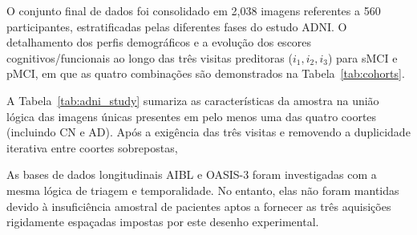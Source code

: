 \documentclass[review]{elsarticle}
\begin{document}
	O conjunto final de dados foi consolidado em 2{,}038 imagens referentes a 560 participantes, estratificadas pelas diferentes fases do estudo ADNI.
	O detalhamento dos perfis demográficos e a evolução dos escores cognitivos/funcionais ao longo das três visitas preditoras ($i_1, i_2, i_3$) para sMCI e pMCI, em que as quatro combinações são demonstrados na Tabela~\ref{tab:cohorts}.
	
	A Tabela~\ref{tab:adni_study} sumariza as características da amostra na união lógica das imagens únicas presentes em pelo menos uma das quatro coortes (incluindo CN e AD). Após a exigência das três visitas e removendo a duplicidade iterativa entre coortes sobrepostas,
	
	As bases de dados longitudinais AIBL \cite{ellis-2009} e OASIS-3 \cite{lamontagne-2019} foram investigadas com a mesma lógica de triagem e temporalidade. No entanto, elas não foram mantidas devido à insuficiência amostral de pacientes aptos a fornecer as três aquisições rigidamente espaçadas impostas por este desenho experimental.
	
\end{document}
